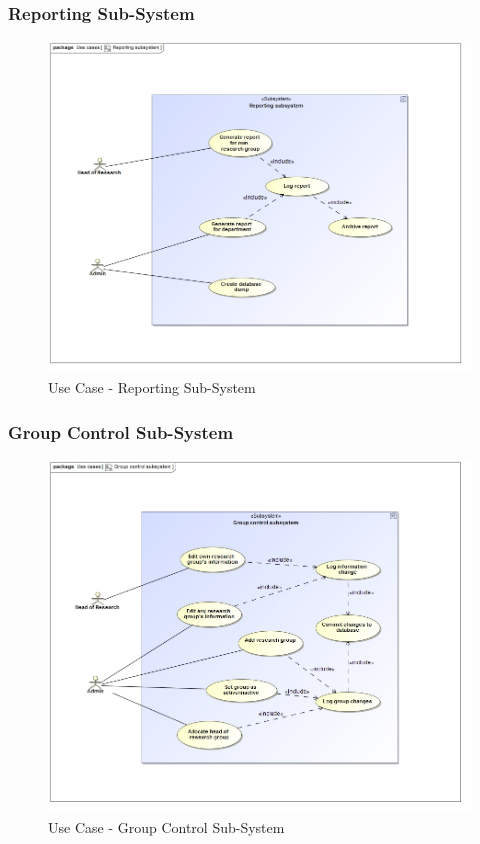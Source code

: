 \documentclass{article}
\begin{document}
			\cleardoublepage
			\subsubsection{Reporting Sub-System}
			\begin{figure}[H]
				\includegraphics[width=\linewidth]{../Diagrams/Use Cases/Reporting subsystem.jpg}
				\caption{Use Case - Reporting Sub-System}
			\end{figure}	
			
			\cleardoublepage
			\subsubsection{Group Control Sub-System}
			\begin{figure}[H]
				\includegraphics[width=\linewidth]{../Diagrams/Use Cases/Group control subsystem.jpg}
				\caption{Use Case - Group Control Sub-System}
			\end{figure}
			
\end{document}
